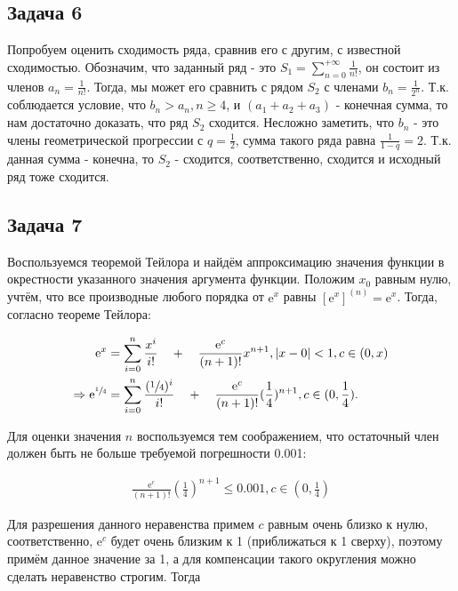 \documentclass[a4paper,11pt]{article}
\newcommand{\e}{\mathrm{e}}
\begin{document}
\subsection{Задача 6}

Попробуем оценить сходимость ряда, сравнив его с другим, с известной сходимостью. Обозначим, что заданный ряд - это $S_1 = \sum_{n=0}^{+\infty}\frac{1}{n!}$, он состоит из членов $a_n = \frac{1}{n!}$. Тогда, мы может его сравнить с рядом $S_2$ с членами $b_n = \frac{1}{2^n}$. Т.к. соблюдается условие, что $b_n > a_n, n \geq 4$, и $(a_1 + a_2 + a_3)$ - конечная сумма, то нам достаточно доказать, что ряд $S_2$ сходится. Несложно заметить, что $b_n$ - это члены геометрической прогрессии с $q = \frac{1}{2}$, сумма такого ряда равна $\frac{1}{1-q} = 2$. Т.к. данная сумма - конечна, то $S_2$ - сходится, соответственно, сходится и исходный ряд тоже сходится.

\subsection{Задача 7}

Воспользуемся теоремой Тейлора и найдём аппроксимацию значения функции в окрестности указанного значения аргумента функции. Положим $x_0$ равным нулю, учтём, что все производные любого порядка от $\e^x$ равны $[\e^x]^{(n)} = \e^x$.  Тогда, согласно теореме Тейлора:

\begin{align*}
\e^x & = \sum_{i=0}^{n} \frac{x^i}{i!} \quad + \quad \frac{\e^c}{(n+1)!}x^{n+1}, 
  |x-0| < 1, c \in (0, x) \\
\Rightarrow
\e^{\sfrac{1}{4}} & = \sum_{i=0}^{n} \frac{(\sfrac{1}{4})^i}{i!} \quad + 
  \quad \frac{\e^c}{(n+1)!}(\frac{1}{4})^{n+1}, c \in (0, \frac{1}{4}).
\end{align*}

Для оценки значения $n$ воспользуемся тем соображением, что остаточный член должен быть не больше требуемой погрешности 0.001:

\begin{align*}
\frac{\e^c}{(n+1)!}(\frac{1}{4})^{n+1} \leq 0.001, c \in (0, \frac{1}{4})
\end{align*}

Для разрешения данного неравенства примем $c$ равным очень близко к нулю, соответственно, $\e^c$ будет очень близким к 1 (приближаться к 1 сверху), поэтому примём данное значение за 1, а для компенсации такого округления можно сделать неравенство строгим. Тогда
\end{document}
